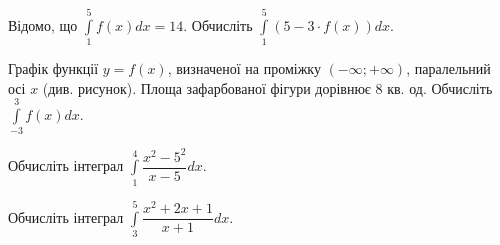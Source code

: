 \documentclass[12pt]{article}
\begin{document}
\begin{samepage}
\noindent\zadnum Відомо, що $\displaystyle\int\limits_1^{5} f(x) dx = 14$. Обчисліть $\displaystyle\int\limits_1^{5} (5 - 3 \cdot f(x)) dx$. 

\nmtnobreak
\nopagebreak\nbvspace{0.5cm}
\nmtAnswerBox
\par{}
\end{samepage}

\begin{samepage}
\noindent
\begin{minipage}[c]{0.56\textwidth}
\zadnum Графік функції $y=f(x)$, визначеної на проміжку $(-\infty; +\infty)$, паралельний осі $x$ (див. рисунок). Площа зафарбованої фігури дорівнює 8 кв. од. Обчисліть $\displaystyle\int\limits_{-3}^{3} f(x) dx$. 
\end{minipage}%
\hfill
\begin{minipage}[c]{0.40\textwidth}
\centering
\begin{nmtfit}\end{nmtfit}
\end{minipage}
\par\nbvspace{0.2cm}
\nmtAnswerBox
\par{}
\end{samepage}

\begin{samepage}
\noindent\zadnum Обчисліть інтеграл $\displaystyle\int\limits_{1}^{4} \dfrac{x^2 - 5^2}{x - 5} dx$. 

\nmtnobreak
\nopagebreak\nbvspace{0.5cm}
\nmtAnswerBox
\par{}
\end{samepage}

\begin{samepage}
\noindent\zadnum Обчисліть інтеграл $\displaystyle\int\limits_{3}^{5} \dfrac{x^2 + 2x + 1}{x + 1} dx$. 

\nmtnobreak
\nopagebreak\nbvspace{0.5cm}
\nmtAnswerBox
\par{}
\end{samepage}
\end{document}
